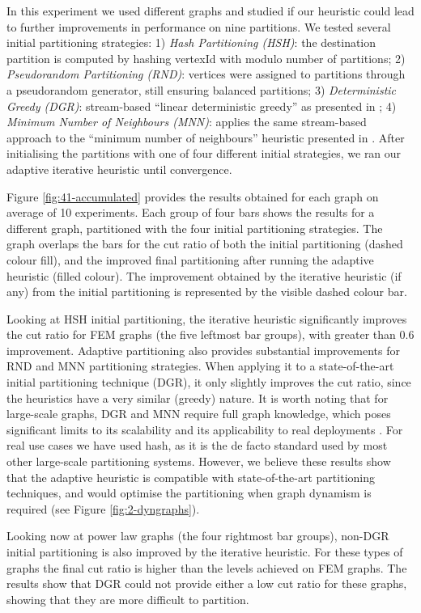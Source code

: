 \documentclass{sig-alternate-10pt}
\begin{document}
In this experiment we used different graphs and studied if our heuristic could lead to further improvements in performance on nine partitions. We tested several initial partitioning strategies: 1) \emph{Hash Partitioning (HSH)}: the destination partition is computed by hashing vertexId with modulo number of partitions; 2) \emph{Pseudorandom Partitioning (RND)}: vertices were assigned to partitions through a pseudorandom generator, still ensuring balanced partitions; 3) \emph{Deterministic Greedy (DGR)}: stream-based ``linear deterministic greedy'' as presented in \cite{Stanton2012}; 4) \emph{Minimum Number of Neighbours (MNN)}: applies the same stream-based approach to the ``minimum number of neighbours'' heuristic presented in \cite{Prabha12}. After initialising the partitions with one of four different initial strategies, we ran our adaptive iterative heuristic until convergence. 

Figure \ref{fig:41-accumulated} provides the results obtained for each graph on average of 10 experiments. Each group of four bars shows the results for a different graph, partitioned with the four initial partitioning strategies. The graph overlaps the bars for the cut ratio of both the initial partitioning (dashed colour fill), and the improved final partitioning after running the adaptive heuristic (filled colour). The improvement obtained by the iterative heuristic (if any) from the initial partitioning is represented by the visible dashed colour bar.

Looking at HSH initial partitioning, the iterative heuristic significantly improves the cut ratio for FEM graphs (the five leftmost bar groups), with greater than $0.6$ improvement. Adaptive partitioning also provides substantial improvements for RND and MNN partitioning strategies. When applying it to a state-of-the-art initial partitioning technique (DGR), it only slightly improves the cut ratio, since the heuristics have a very similar (greedy) nature. It is worth noting that for large-scale graphs, DGR and MNN require full graph knowledge, which poses significant limits to its scalability and its applicability to real deployments \cite{Ugander}. For real use cases we have used hash, as it is the de facto standard used by most other large-scale partitioning systems. However, we believe these results show that  the adaptive heuristic is compatible with state-of-the-art partitioning techniques, and would optimise the partitioning when graph dynamism is required (see Figure \ref{fig:2-dyngraphs}). 

Looking now at power law graphs (the four rightmost bar groups), non-DGR initial partitioning is also improved by the iterative heuristic. For these types of graphs the final cut ratio is higher than the levels achieved on FEM graphs. The results show that DGR could not provide either a low cut ratio for these graphs, showing that they are more difficult to partition.
\end{document}
